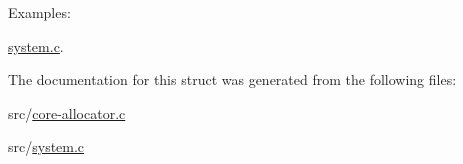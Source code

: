 \begin{Desc}
\item[Examples: ]\par
\hyperlink{system_8c-example}{system.c}.\end{Desc}


The documentation for this struct was generated from the following files:\begin{CompactItemize}
\item 
src/\hyperlink{core-allocator_8c}{core-allocator.c}\item 
src/\hyperlink{system_8c}{system.c}\end{CompactItemize}
